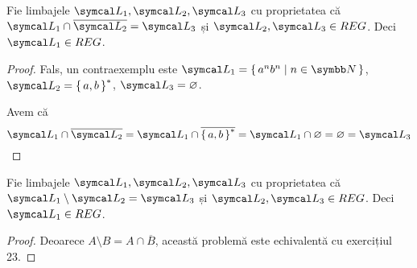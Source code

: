 \begin{exercise}
    Fie limbajele \(\limbaj_1, \limbaj_2, \limbaj_3\) cu proprietatea că \(\limbaj_1 \cap \overline{\limbaj_2} = \limbaj_3\) și \(\limbaj_2, \limbaj_3 \in REG\). Deci \(\limbaj_1 \in REG\).
\end{exercise}
\begin{proof}
    Fals, un contraexemplu este \(\limbaj_1 = \set{ a^n b^n | n \in \naturals }\), \(\limbaj_2 = \set{a, b}^*\), \(\limbaj_3 = \varnothing\).

    Avem că
    \[\limbaj_1 \cap \overline{\limbaj_2} = \limbaj_1 \cap \overline{\set{ a, b }^* } = \limbaj_1 \cap \varnothing = \varnothing = \limbaj_3\]
\end{proof}

\begin{exercise}
    Fie limbajele \(\limbaj_1, \limbaj_2, \limbaj_3\) cu proprietatea că \(\limbaj_1 \setminus \limbaj_2 = \limbaj_3\) și \(\limbaj_2, \limbaj_3 \in REG\). Deci \(\limbaj_1 \in REG\).
\end{exercise}
\begin{proof}
    Deoarece \(A \setminus B = A \cap \overline{B}\), această problemă este echivalentă cu exercițiul 23.
\end{proof}
